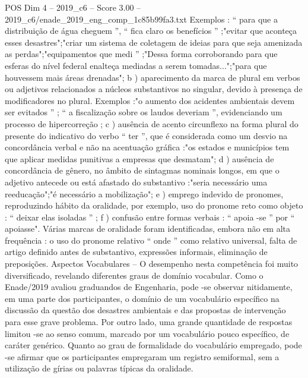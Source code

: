 \begin{textsample}{POS Dim 4 – 2019\_c6 – Score 3.00 – 2019\_c6/enade\_2019\_eng\_comp\_1c85b99fa3.txt}
Exemplos : “ para que a distribuição de água cheguem ”, “ fica claro os benefícios ” ;"evitar que aconteça esses desastres";"criar um sistema de coletagem de ideias para que seja amenizada as perdas";"equipamentos que medi ” ;"Dessa forma corroborando para que esferas do nível federal enalteça mediadas a serem tomadas...";"para que houvessem mais áreas drenadas"; b ) aparecimento da marca de plural em verbos ou adjetivos relacionados a núcleos substantivos no singular, devido à presença de modificadores no plural.
Exemplos :"o aumento dos acidentes ambientais devem ser evitados ” ; “ a fiscalização sobre os laudos deveriam ”, evidenciando um processo de hipercorreção ; c ) ausência de acento circunflexo na forma plural do presente do indicativo do verbo “ ter ”, que é considerada como um desvio na concordância verbal e não na acentuação gráfica :"os estados e municípios tem que aplicar medidas punitivas a empresas que desmatam"; d ) ausência de concordância de gênero, no âmbito de sintagmas nominais longos, em que o adjetivo antecede ou está afastado do substantivo :"seria necessário uma reeducação";"é necessário a mobilização"; e ) emprego indevido de pronomes, reproduzindo hábito da oralidade, por exemplo, uso do pronome reto como objeto : “ deixar elas isoladas ” ; f ) confusão entre formas verbais : “ apoia -se ” por “ apoiasse".
Várias marcas de oralidade foram identificadas, embora não em alta frequência : o uso do pronome relativo “ onde ” como relativo universal, falta de artigo definido antes de substantivo, expressões informais, eliminação de preposições.
Aspectos Vocabulares – O desempenho nesta competência foi muito diversificado, revelando diferentes graus de domínio vocabular.
Como o Enade/2019 avaliou graduandos de Engenharia, pode -se observar nitidamente, em uma parte dos participantes, o domínio de um vocabulário específico na discussão da questão dos desastres ambientais e das propostas de intervenção para esse grave problema.
Por outro lado, uma grande quantidade de respostas limitou -se ao senso comum, marcado por um vocabulário pouco específico, de caráter genérico.
Quanto ao grau de formalidade do vocabulário empregado, pode -se afirmar que os participantes empregaram um registro semiformal, sem a utilização de gírias ou palavras típicas da oralidade.

\end{textsample}

